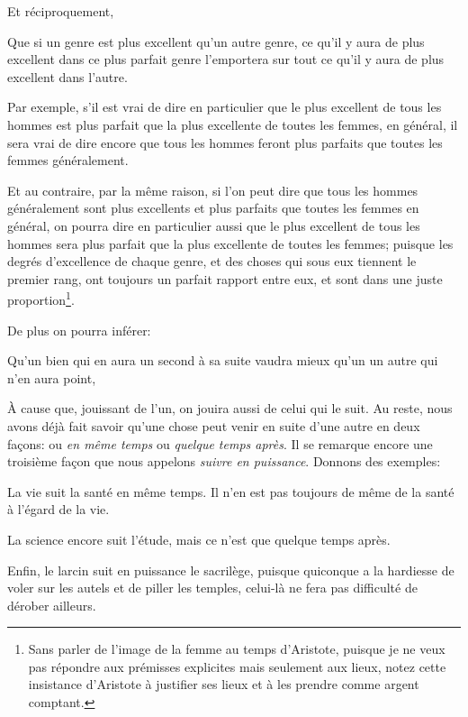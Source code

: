 Et réciproquement, 
\begin{emphpar}
	Que si un genre est plus excellent qu'un autre genre, ce qu'il y aura de plus excellent dans ce plus parfait genre
	l'emportera sur tout ce qu'il y aura de plus excellent dans l'autre.
\end{emphpar}

Par exemple, s'il est vrai de dire en particulier que le plus excellent de tous les hommes est plus parfait que la plus
excellente de toutes les femmes, en général, il sera vrai de dire encore que tous les hommes feront plus parfaits que
toutes les femmes généralement. 

Et au contraire, par la même raison, si l'on peut dire que tous les hommes généralement sont plus excellents et plus parfaits
que toutes les femmes en général, on pourra dire en particulier aussi que le plus excellent de tous les hommes sera plus
parfait que la plus excellente de toutes les femmes; puisque les degrés d'excellence de chaque genre, et des choses qui sous
eux tiennent le premier rang, ont toujours un parfait rapport entre eux, et sont dans une juste proportion\footnote{Sans parler
de l'image de la femme au temps d'Aristote, puisque je ne veux pas répondre aux prémisses explicites mais seulement aux lieux,
notez cette insistance d'Aristote à justifier ses lieux et à les prendre comme argent comptant.}.

\bigbreak 

De plus on pourra inférer:

\begin{emphpar}
	Qu'un bien qui en aura un second à sa suite vaudra mieux qu'un un autre qui n'en aura point,
\end{emphpar}

À cause que, jouissant de l'un, on jouira aussi de celui qui le suit. Au reste, nous avons déjà fait
savoir qu'une chose peut venir en suite d'une autre en deux façons: ou \emph{en même temps} ou \emph{
quelque temps après}. Il se remarque encore une troisième façon que nous appelons \emph{suivre en 
puissance}. Donnons des exemples:

La vie suit la santé en même temps. Il n'en est pas toujours de même de la santé à l'égard de la vie.

La science encore suit l’étude, mais ce n'est que quelque temps après.

Enfin, le larcin suit en puissance le sacrilège, puisque quiconque a la hardiesse de voler sur les autels
et de piller les temples, celui-là ne fera pas difficulté de dérober ailleurs.


